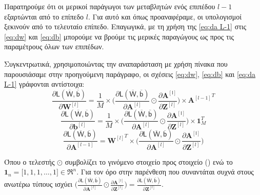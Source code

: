 Παρατηρούμε ότι οι μερικοί παράγωγοι των μεταβλητών ενός επιπέδου $l-1$ εξαρτώνται από το επίπεδο $l$. Για αυτό και όπως προαναφέραμε, οι υπολογισμοί ξεκινούν από το τελευταίο επίπεδο. Επαγωγικά, με τη χρήση της \ref{eq:da L-1} στις \ref{eq:dw} και \ref{eq:db} μπορούμε να βρούμε τις μερικές παραγώγους ως προς τις παραμέτρους όλων των επιπέδων.\par

Συγκεντρωτικά, χρησιμοποιώντας την αναπαράσταση με χρήση πίνακα που παρουσιάσαμε στην προηγούμενη παράγραφο, οι σχέσεις \ref{eq:dw}, \ref{eq:db} και \ref{eq:da L-1} γράφονται αντίστοιχα:
\begin{equation}\label{eq:_bw}
  \frac{\partial \mathsf{L(\overline{W},\overline{b})}}{{\partial \boldsymbol{W}^{[l]}}} = \frac{1}{M} \times \big(\frac{\partial \mathsf{L(\overline{W},\overline{b})}}{\partial \boldsymbol{A}^{[l]}} \odot \frac{\partial \mathsf{{\boldsymbol{A}^{[l]}}}}{\partial \boldsymbol{Z}^{[l]}} \big) \times {\boldsymbol{A}^{[l-1]}}^T
\end{equation}
\begin{equation}\label{eq:_bb}
  \frac{\partial \mathsf{L(\overline{W},\overline{b})}}{\partial \boldsymbol{b}^{[l]}} = \frac{1}{M} \times \big(\frac{\partial \mathsf{L(\overline{W},\overline{b})}}{\partial \boldsymbol{A}^{[l]}} \odot \frac{\partial \mathsf{{\boldsymbol{A}^{[l]}}}}{\partial \boldsymbol{Z}^{[l]}} \big) \times \boldsymbol{1}_M^T
\end{equation}
\begin{equation}\label{eq:_ba}
  \frac{\partial \mathsf{L(\overline{W},\overline{b})}}{{\partial \boldsymbol{A}^{[l-1]}}} =  {\boldsymbol{W}^{[l]}}^T\times \big(\frac{\partial \mathsf{L(\overline{W},\overline{b})}}{\partial \boldsymbol{A}^{[l]}} \odot \frac{\partial \mathsf{{\boldsymbol{A}^{[l]}}}}{\partial \boldsymbol{Z}^{[l]}} \big) 
\end{equation}

Όπου ο τελεστής $\odot$ συμβολίζει το γινόμενο στοιχείο προς στοιχείο () ενώ το $\boldsymbol{1}_n = \big[1, 1, 1, \dots, 1\big] \in \Re^n$. Για τον όρο στην παρένθεση που συναντάται συχνά στους ανωτέρω τύπους ισχύει $\big(\frac{\partial \mathsf{L(\overline{W},\overline{b})}}{\partial \boldsymbol{A}^{[l]}} \odot \frac{\partial \mathsf{{\boldsymbol{A}^{[l]}}}}{\partial \boldsymbol{Z}^{[l]}} \big) = \frac{\partial \mathsf{L(\overline{W},\overline{b})}}{{\partial \boldsymbol{Z}^{[l]}}}$. \par

